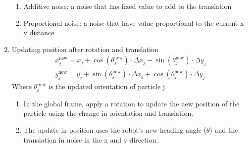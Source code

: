 \begin{enumerate}
\begin{enumerate}
        \item Additive noise: a noise that has fixed value to add to the translation
        \item Proportional noise: a noise that have value proportional to the current x-y distance
    \end{enumerate}
    \item Updating position after rotation and translation
    \begin{align}
        x_j^{\text{new}} = x_j + \cos(\theta_j^{\text{new}}) \cdot \Delta x_j - \sin(\theta_j^{\text{new}}) \cdot \Delta y_j\\
        y_j^{\text{new}} = y_j + \sin(\theta_j^{\text{new}}) \cdot \Delta x_j + \cos(\theta_j^{\text{new}}) \cdot \Delta y_j
    \end{align}
    Where $\theta_j^{new}$ is the updated orientation of particle j.
    \begin{enumerate}
        \item In the global frame, apply a rotation to update the new position of the particle using the change in orientation and translation.
        \item The update in position uses the robot's new heading angle ($\theta$) and the translation in noise in the x and y direction.
    \end{enumerate}
\end{enumerate}

